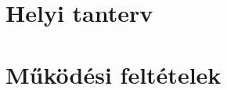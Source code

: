 \documentclass[10pt,openright,twoside]{book}
\begin{document}
\chapter{Helyi tanterv}









\vspace*{-.8ex}

\vspace*{-.8ex}

% 
\chapter{Működési feltételek}


\backmatter

\end{document}
